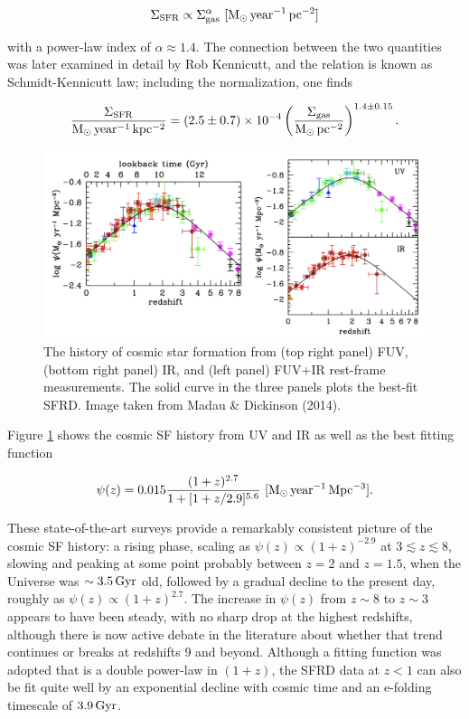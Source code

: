 \documentclass[a4paper,10pt]{article}
\begin{document}
\begin{align*}
    \Sigma_\mathrm{SFR} \propto \Sigma_\mathrm{gas}^\alpha ~ [{\rm M_\odot\,year^{-1}\,pc^{-2}}]
\end{align*}

{\noindent}with a power-law index of $\alpha\approx1.4$. The connection between the two quantities was later examined in detail by Rob Kennicutt, and the relation is known as Schmidt-Kennicutt law; including the normalization, one finds

\begin{align*}
    \frac{\Sigma_\mathrm{SFR}}{{\rm M_\odot\,year^{-1}\,kpc^{-2}}} = (2.5\pm0.7)\times10^{-4} \left(\frac{\Sigma_\mathrm{gas}}{{\rm M_\odot\,pc^{-2}}}\right)^{1.4\pm0.15}.
\end{align*}

\begin{figure}[h]
    \centering
    \includegraphics[width=16cm]{figures/SFhistory.png}
    \caption{\footnotesize{The history of cosmic star formation from (top right panel) FUV, (bottom right panel) IR, and (left panel) FUV+IR rest-frame measurements. The solid curve in the three panels plots the best-fit SFRD. Image taken from Madau \& Dickinson (2014).}}
    \label{fig:sfhistory}
\end{figure}

{\noindent}Figure \ref{fig:sfhistory} shows the cosmic SF history from UV and IR as well as the best fitting function

\begin{align*}
    \psi(z) = 0.015\frac{(1+z)^{2.7}}{1+[1+z/2.9]^{5.6}} ~ [{\rm M_\odot\,year^{-1}\,Mpc^{-3}}].
\end{align*}

{\noindent}These state-of-the-art surveys provide a remarkably consistent picture of the cosmic SF history: a rising phase, scaling as $\psi(z)\propto(1+z)^{-2.9}$ at $3\lesssim z\lesssim8$, slowing and peaking at some point probably between $z=2$ and $z=1.5$, when the Universe was $\sim3.5\,{\rm Gyr}$ old, followed by a gradual decline to the present day, roughly as $\psi(z)\propto(1+z)^{2.7}$. The increase in $\psi(z)$ from $z\sim8$ to $z\sim3$ appears to have been steady, with no sharp drop at the highest redshifts, although there is now active debate in the literature about whether that trend continues or breaks at redshifts $9$ and beyond. Although a fitting function was adopted that is a double power-law in $(1+z)$, the SFRD data at $z<1$ can also be fit quite well by an exponential decline with cosmic time and an e-folding timescale of $3.9\,{\rm Gyr}$.
\end{document}
